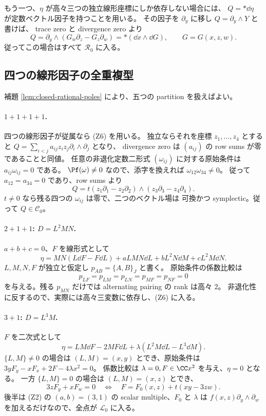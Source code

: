 もう一つ、$\eta$ が高々三つの独立線形座標にしか依存しない場合には、
$Q=*\dd\eta$ が定数ベクトル因子を持つことを用いる。
その因子を $\partial_y$ に移し $Q=\partial_y\wedge Y$ と書けば、
trace zero と divergence zero より
\[
 Q=\partial_y\wedge(G_w\partial_z-G_z\partial_w)
   =*(\dd x\wedge\dd G),\qquad G=G(x,z,w).
 \tag{Z6}
\]
従ってこの場合はすべて $\mathcal R_0$ に入る。

\subsection{四つの線形因子の全重複型}

補題 \ref{lem:closed-rational-poles} により、五つの partition を扱えばよい。

\paragraph{$1+1+1+1$.}
四つの線形因子が従属なら (Z6) を用いる。
独立ならそれを座標 $z_1,\ldots,z_4$ とすると
$Q=\sum_{i<j}a_{ij}z_iz_j\partial_i\wedge\partial_j$ となり、
divergence zero は $(a_{ij})$ の row sums が零であることと同値。
任意の非退化定数二形式 $(\omega_{ij})$ に対する原始条件は
$a_{ij}\omega_{ij}=0$ である。
$\Pf(\omega)\ne0$ なので、添字を換えれば $\omega_{12}\omega_{34}\ne0$。
従って $a_{12}=a_{34}=0$ であり、row sums より
\[
 Q=t(z_1\partial_1-z_2\partial_2)
       \wedge(z_3\partial_3-z_4\partial_4).
\]
$t\ne0$ なら残る四つの $\omega_{ij}$ は零で、二つのベクトル場は
可換かつ symplectic。従って $Q\in\mathcal C_0$。

\paragraph{$2+1+1$: $D=L^2MN$.}
$a+b+c=0$、$F$ を線形式として
\[
 \eta=MN(L\dd F-F\dd L)+aLMN\dd L+bL^2N\dd M+cL^2M\dd N.
\]
$L,M,N,F$ が独立と仮定し $p_{AB}=\{A,B\}_J$ と書く。
原始条件の係数比較は
\[
 p_{LF}=p_{LM}=p_{LN}=p_{MF}=p_{NF}=0
\]
を与える。残る $p_{MN}$ だけでは alternating pairing の rank は高々 $2$。
非退化性に反するので、実際には高々三変数に依存し、(Z6) に入る。

\paragraph{$3+1$: $D=L^3M$.}
$F$ を二次式として
\[
 \eta=LM\dd F-2MF\dd L+\lambda(L^2M\dd L-L^3\dd M).
\]
$\{L,M\}\ne0$ の場合は $(L,M)=(x,y)$ とでき、原始条件は
$3yF_y-xF_x+2F-4\lambda x^2=0$。
係数比較は $\lambda=0,F\in\CC x^2$ を与え、$\eta=0$ となる。
一方 $\{L,M\}=0$ の場合は $(L,M)=(x,z)$ とでき、
\[
 3zF_y+xF_w=0\quad\Longleftrightarrow\quad
 F=F_0(x,z)+t(xy-3zw).
\]
後半は (Z2) の $(a,b)=(3,1)$ の scalar multiple、$F_0$ と $\lambda$ は
$f(x,z)\partial_y\wedge\partial_w$ を加えるだけなので、全点が $\mathcal L_0$ に入る。

